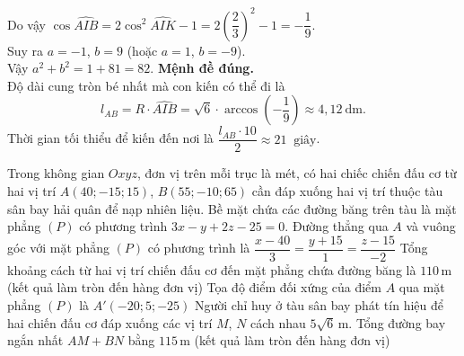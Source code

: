 \begin{ex}
{\begin{itemchoice}
			Do vậy $\cos\widehat{AIB} = 2\cos^2\widehat{AIK}-1 = 2\left(\dfrac{2}{3}\right)^2-1  =-\dfrac{1}{9}$.\\
			Suy ra $a=-1$,  $b=9$ (hoặc $a=1$, $b=-9$).\\
			 Vậy $a^2+b^2=1+81=82$.
			\itemch \textbf{Mệnh đề  đúng.}\\
			Độ dài cung tròn  bé nhất mà con kiến có thể đi là
			 \[l_{AB}=R\cdot \widehat{AIB}=\sqrt{6}\cdot\arccos\left(-\dfrac{1}{9}\right)\approx4{,}12~\mathrm{dm}.\]
			Thời  gian tối thiểu để kiến đến nơi là $\dfrac{l_{AB}\cdot10}{2} \approx 21~\text{ giây}$.
		\end{itemchoice}
	} 
\end{ex}

\begin{ex}%
	Trong không gian $Oxyz$, đơn vị trên mỗi trục là mét,  có hai chiếc chiến đấu cơ từ hai vị trí $A(40;-15;15)$, $B(55;-10;65)$ cần đáp xuống hai vị trí thuộc tàu sân bay hải quân để nạp nhiên liệu. Bề mặt chứa các đường băng trên tàu là mặt phẳng $(P)$ có phương trình $3x-y+2z-25=0$.
	\choiceTF 
		{Đường thẳng qua $A$ và vuông góc với mặt phẳng $(P)$ có phương trình là  $\dfrac{x-40}{3}=\dfrac{y+15}{1}=\dfrac{z-15}{-2}$}
		{Tổng khoảng cách từ hai vị trí chiến đấu cơ đến mặt phẳng chứa đường băng là  $110$\,m (kết quả làm tròn đến hàng đơn vị)}
		{\True Tọa độ điểm đối xứng của điểm $A$ qua mặt  phẳng $(P)$ là $A'(-20;5;-25)$}
		{\True Người chỉ huy ở tàu sân bay phát tín hiệu để hai chiến đấu cơ đáp xuống các vị trí $M$, $N$ cách nhau $5\sqrt{6}$\,m. Tổng đường bay ngắn nhất  $AM+BN$ bằng $115$\,m (kết quả làm tròn đến hàng đơn vị)}
\end{ex}
